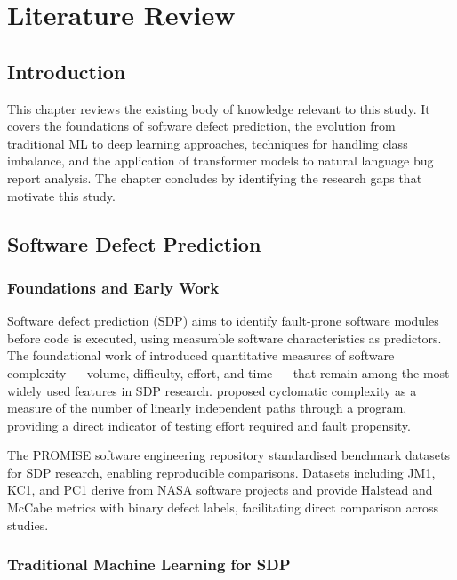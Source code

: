 \documentclass[12pt,a4paper,oneside]{report}
\begin{document}
\chapter{Literature Review}

\section{Introduction}

This chapter reviews the existing body of knowledge relevant to this study. It covers the foundations of software defect prediction, the evolution from traditional ML to deep learning approaches, techniques for handling class imbalance, and the application of transformer models to natural language bug report analysis. The chapter concludes by identifying the research gaps that motivate this study.

\section{Software Defect Prediction}

\subsection{Foundations and Early Work}

Software defect prediction (SDP) aims to identify fault-prone software modules before code is executed, using measurable software characteristics as predictors. The foundational work of \citet{halstead1977} introduced quantitative measures of software complexity --- volume, difficulty, effort, and time --- that remain among the most widely used features in SDP research. \citet{mccabe1976} proposed cyclomatic complexity as a measure of the number of linearly independent paths through a program, providing a direct indicator of testing effort required and fault propensity.

The PROMISE software engineering repository \citep{promise} standardised benchmark datasets for SDP research, enabling reproducible comparisons. Datasets including JM1, KC1, and PC1 derive from NASA software projects and provide Halstead and McCabe metrics with binary defect labels, facilitating direct comparison across studies.

\subsection{Traditional Machine Learning for SDP}
\end{document}
